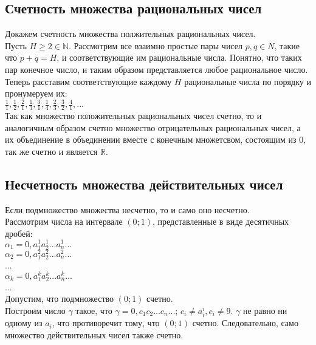 \documentclass{article}
\begin{document}
        
    \subsection*{Счетность множества рациональных чисел}
        Докажем счетность множества полжительных рациональных чисел.
        \\ 
        Пусть $H \ge 2 \in \mathbb{N}$. Рассмотрим все взаимно простые пары чисел $p, q \in {N}$, такие что $p + q = H$, и соответствующие им рациональные числа.
        Понятно, что таких пар конечное число, и таким образом представляется любое рациональное число.
        \\
        Теперь расставим соответствующие каждому $H$ рациональные числа по порядку и пронумеруем их:
        \\
        $\frac{1}{1}, \frac{1}{2}, \frac{2}{1}, \frac{1}{3}, \frac{3}{1}, \frac{1}{4}, \frac{2}{3}, \frac{3}{2}, \frac{4}{1}, ...$
        \\
        Так как множество положительных рациональных чисел счетно, то и аналогичным образом счетно множество отрицательных рациональных чисел,
        а их объединение в объединении вместе с конечным множетсвом, состоящим из $0$, так же счетно и является $\mathbb{R}$.
        
        
    \subsection*{Несчетность множества действительных чисел}
        Если подмножество множества несчетно, то и само оно несчетно.
        \\
        Рассмотрим числа на интервале $(0;1)$, представленные в виде десятичных дробей:
        \\
        $\alpha_1 = 0,a_1^1a_2^1...a_n^1...$
        \\
        $\alpha_2 = 0,a_1^2a_2^2...a_n^2...$
        \\
        ...
        \\
        $\alpha_k = 0,a_1^ka_2^k...a_n^k...$
        \\
        ...
        \\
        Допустим, что подмножество $(0;1)$ счетно.
        \\
        Построим число $\gamma$ такое, что $\gamma = 0,c_1c_2...c_n...$; $c_i \neq a_i^i, c_i \neq 9$. $\gamma$ не равно ни одному из $a_i$,
        что противоречит тому, что $(0;1)$ счетно. Следовательно, само множество действительных чисел также счетно.
        
\end{document}
